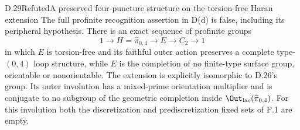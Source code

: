 \begin{claim}{D.29}{Refuted}{A preserved four-puncture structure on the torsion-free Haran extension}
The full profinite recognition assertion in D(d) is false, including
its peripheral hypothesis.  There is an exact sequence of profinite
groups
\[
 1\longrightarrow H=\widehat\pi_{0,4}
 \longrightarrow E\longrightarrow C_2\longrightarrow1
                                                        \tag{D.29.1}
\]
in which $E$ is torsion-free and its faithful outer action preserves
a complete type-$(0,4)$ loop structure, while $E$ is the completion
of no finite-type surface group, orientable or nonorientable.
The extension is explicitly isomorphic to D.26's group.
Its outer involution has a mixed-prime orientation multiplier and
is conjugate to no subgroup of the geometric completion inside
$\Out_{\rm lac}(\widehat\pi_{0,4})$.
For this involution both the discretization and prediscretization
fixed sets of F.1 are empty.
\end{claim}
